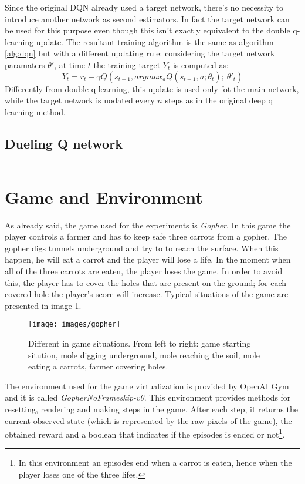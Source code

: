 \documentclass[article,11pt]{article}
\begin{document}
	Since the original DQN already used a target network, there's no necessity to introduce another network as second estimators. In fact the target network can be used for this purpose even though this isn't exactly equivalent to the double q-learning update. The resultant training algorithm is the same as algorithm \ref{alg:dqn} but with a different updating rule: considering the target network paramaters $\theta'$, at time $t$ the training target $Y_t$ is computed as:
	\begin{equation}
		Y_t = r_t - \gamma Q(s_{t+1}, argmax_aQ(s_{t+1}, a; \theta_t);\ \theta'_t)
	\end{equation}
	Differently from double q-learning, this update is used only fot the main network, while the target network is uodated every $n$ steps as in the original deep q learning method.
	
	\subsection{Dueling Q network}
	
	\begin{equation}
		\label{eq:dueling}
	\end{equation}
	
	\section{Game and Environment}
	As already said, the game used for the experiments is \textit{Gopher}. In this game the player controls a farmer and has to keep safe three carrots from a gopher. The gopher digs tunnels underground and try to to reach the surface. When this happen, he will eat a carrot and the player will lose a life. In the moment when all of the three carrots are eaten, the player loses the game. In order to avoid this, the player has to cover the holes that are present on the ground; for each covered hole the player's score will increase. Typical situations of the game are presented in image \ref{fig:gopher}.
	
	\begin{figure}
		\texttt{[image: images/gopher]}
		\caption{Different in game situations. From left to right: game starting sitution, mole digging underground, mole reaching the soil, mole eating a carrots, farmer covering holes.}
		\label{fig:gopher}
	\end{figure}	

	The environment used for the game virtualization is provided by OpenAI Gym and it is called \textit{GopherNoFrameskip-v0}. This environment provides methods for resetting, rendering and making steps in the game. After each step, it returns the current observed state (which is represented by the raw pixels of the game), the obtained reward and a boolean that indicates if the episodes is ended or not\footnote{In this environment an episodes end when a carrot is eaten, hence when the player loses one of the three lifes.}.
	
\end{document}
